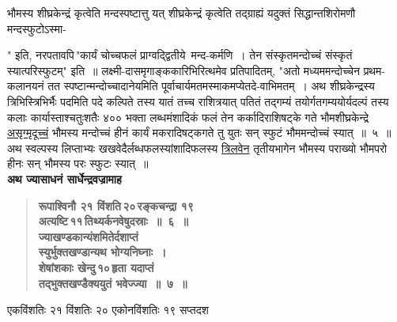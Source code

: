 \documentclass[11pt, openany]{book}
\begin{document}
भौमस्य शीघ्रकेन्द्रं कृत्वेति मन्दस्पष्टात्तु यत् शीघ्रकेन्द्रं कृत्वेति तद्ग्राह्यं यदुक्तं {\color{violet}सिद्धान्तशिरोमणौ\textendash \,मन्दस्फुटोऽस्मा-}

\newpage

\begin{sloppypar}
" इति, {\color{violet}नरपता}वपि\textendash \,{\color{violet}"कार्यं चोच्चफलं प्राग्वद्द्वितीये~मन्द-कर्मणि~। तेन संस्कृतमन्दोच्चं संस्कृतं स्यात्परिस्फुटम्}" इति~॥ {\color{violet}लक्ष्मी-दासमृगाङ्ककारि}भिरित्थमेव प्रतिपादितम्, {\color{violet}"अतो मध्यममन्दोच्चेन प्रथम-कलानयनं तत स्पष्टान्मन्दोच्चादानेय}मिति पूर्वाचार्यमतमस्माकमप्येतदे-वाभिमतम्~। अथ शीघ्रकेन्द्रस्य त्रिभिस्त्रिभिर्भैः पदमिति पदे कल्पिते तस्य यातं तच्च राशित्रयात् पतितं तद्गम्यं तयोर्गतगम्ययोर्यदल्पं तस्य कलाः कार्यास्ताश्चतुःशतैः ४०० भक्ता लब्धमंशादिकं फलं तेन कर्कादिराशिषट्के गते भौमशीघ्रकेन्द्रे \hyperref[2.5]{असृग्मृदूच्चं} भौमस्य मन्दोच्चं हीनं कार्यं मकरादिषट्कगते तु युतः सन् स्फुटं भौममन्दोच्चं स्यात्~॥~५~॥ अथ स्वल्पस्य लिप्ताभ्यः खखवेदैर्लब्धफलस्यांशादिफलस्य \hyperref[2.5]{त्रिलवेन} तृतीयभागेन भौमस्य पराख्यो भौमपरो हीनः सन् भौमस्य परः स्फुटः स्यात्~॥\\

{\small \textbf{अथ ज्यासाधनं सार्धेन्द्रवज्रामाह\textendash }}

 \label{2.6}
\begin{quote}
{\large \textbf{{\color{purple}रूपाश्विनौ २१ विंशति\textendash \,२०\textendash \,रङ्कचन्द्रा १९\\
अत्यष्टि\textendash \,११\textendash \,तिथ्यर्कनवेषुदस्राः~॥~६~॥\\
ज्याखण्डकान्यंशमितेर्दशाप्तं \\
स्युर्भुक्तखण्डान्यथ भोग्यनिघ्नाः~। \\
शेषांशकाः खेन्दु\textendash \,१०\textendash \,हृता यदाप्तं \\
तद्भुक्तखण्डैक्ययुतं भवेज्ज्या~॥~७~॥}}}
\end{quote}

एकविंशतिः २१ विंशतिः २० एकोनविंशतिः १९ सप्तदश
\end{sloppypar}

\newpage
\end{document}
